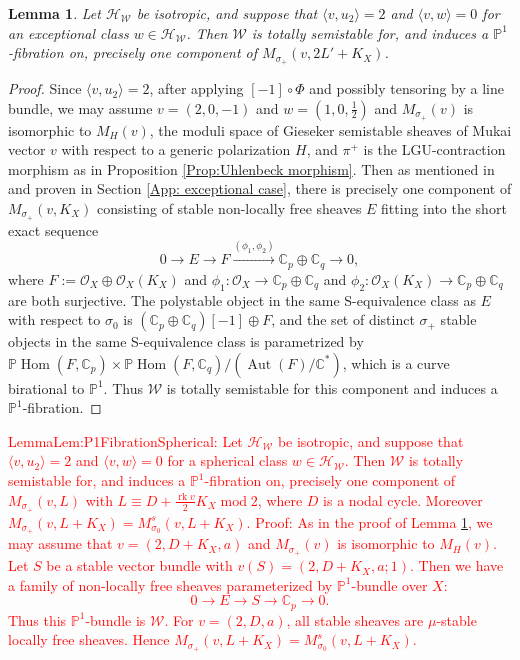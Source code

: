 \documentclass[leqno,11pt]{amsart}
\def\C{\ensuremath{\mathbb{C}}}
\def\P{\ensuremath{\mathbb{P}}}
\def\Aut{\mathop{\mathrm{Aut}}\nolimits}
\def\Hom{\mathop{\mathrm{Hom}}\nolimits}
\def\mod{\mathop{\mathrm{mod}}\nolimits}
\def\rk{\mathop{\mathrm{rk}}}
\newtheorem{Lem}[Thm]{Lemma}
\theoremstyle{definition}
\def\C{\ensuremath{\mathbb{C}}}
\def\P{\ensuremath{\mathbb{P}}}
\def\HH{\ensuremath{\mathcal H}}
\def\OO{\ensuremath{\mathcal O}}
\def\WW{\ensuremath{\mathcal W}}
\newcommand{\mor}[1][]{\xrightarrow{#1}}
\begin{document}
\begin{Lem}\label{Lem:P1FibrationExceptional}
Let $\HH_{\WW}$ be isotropic, and suppose that $\langle v,u_2\rangle=2$ and $\langle v,w\rangle=0$ for an exceptional class $w\in\HH_{\WW}$.  Then $\WW$ is totally semistable for, and induces a $\P^1$-fibration on, precisely one component of $M_{\sigma_+}(v,2L'+K_X)$.
\end{Lem}
\begin{proof}
Since $\langle v,u_2\rangle=2$, after applying $[-1]\circ\Phi$ and possibly tensoring by a line bundle, we may assume $v=(2,0,-1)$ and $w=(1,0,\frac{1}{2})$ and $M_{\sigma_+}(v)$ is isomorphic to $M_H(v)$, the moduli space of Gieseker semistable sheaves of Mukai vector $v$ with respect to a generic polarization $H$, and $\pi^+$ is the LGU-contraction morphism as in Proposition \ref{Prop:Uhlenbeck morphism}.  Then as mentioned in \cite[Remark 2.3]{Yos16a} and proven in Section \ref{App: exceptional case}, there is precisely one component of $M_{\sigma_+}(v,K_X)$ consisting of stable non-locally free sheaves $E$ fitting into the short exact sequence $$0\to E\to F\mor[(\phi_1,\phi_2)]\C_p\oplus\C_q\to 0,$$ where $F:=\OO_X\oplus\OO_X(K_X)$ and  $\phi_1:\OO_X\to\C_p\oplus\C_q$ and $\phi_2:\OO_X(K_X)\to\C_p\oplus\C_q$ are both surjective.  The polystable object in the same S-equivalence class as $E$ with respect to $\sigma_0$ is $(\C_p\oplus\C_q)[-1]\oplus F$, and the set of distinct $\sigma_+$ stable objects in the same S-equivalence class is parametrized by $\P\Hom(F,\C_p)\times\P\Hom(F,\C_q)/(\Aut(F)/\C^*)$, which is a curve birational to $\P^1$.  Thus $\WW$ is totally semistable for this component and induces a $\P^1$-fibration.  
\end{proof}

\textcolor{red}{
Lemma{Lem:P1FibrationSpherical}: 
Let $\HH_{\WW}$ be isotropic, and suppose that $\langle v,u_2\rangle=2$ and $\langle v,w\rangle=0$ for a spherical class $w\in\HH_{\WW}$.  
Then $\WW$ is totally semistable for, and induces a $\P^1$-fibration on, precisely one component of $M_{\sigma_+}(v,L)$ with $L \equiv D+\frac{\rk v}{2}K_X \mod 2$,
where $D$ is a nodal cycle. Moreover
$M_{\sigma_+}(v,L+K_X)=M_{\sigma_0}^s(v,L+K_X)$.
Proof:
As in the proof of Lemma \ref{Lem:P1FibrationExceptional},
we may assume that $v=(2,D+K_X,a)$ and $M_{\sigma_+}(v)$ is isomorphic to
$M_H(v)$. Let $S$ be a stable vector bundle with $v(S)=(2,D+K_X,a;1)$.
Then we have a family of non-locally free sheaves parameterized by $\P^1$-bundle over $X$: 
$$
0 \to E \to S \to \C_p \to 0.
$$
Thus this $\P^1$-bundle is $\WW$.
For $v=(2,D,a)$, all stable sheaves are $\mu$-stable locally free sheaves.
Hence $M_{\sigma_+}(v,L+K_X)=M_{\sigma_0}^s(v,L+K_X)$.
}
\end{document}
